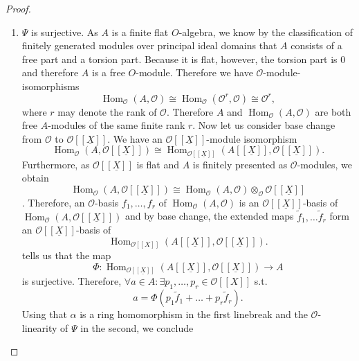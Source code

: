 \documentclass{article}
\theoremstyle{plain}%
\theoremstyle{definition}
\theoremstyle{remark}
\renewcommand{\hom}{\operatorname{Hom}}
\begin{document}
\begin{proof}
\begin{enumerate}
        \item \(\Psi\) is surjective.
        As \(A\) is a finite flat \(O\)-algebra, we know by the classification of finitely generated modules
        over principal ideal domains that \(A\) consists of a free part and a torsion part. Because it is flat,
        however, the torsion part is 0 and therefore \(A\) is a free \(O\)-module.
        Therefore we have \(\mathcal{O}\)-module-isomorphisms
        \[
            \hom_\mathcal{O}(A, \mathcal{O}) \cong \hom_\mathcal{O}(\mathcal{O}^r, \mathcal{O})
            \cong \mathcal{O}^r,
        \]
        where \(r\) may denote the rank of \(\mathcal{O}\). 
        Therefore \(A\) and \(\hom_\mathcal{O}(A, \mathcal{O})\) are both free \(A\)-modules of the 
        same finite rank \(r\). Now let us consider base change from \(\mathcal{O}\) to \(\mathcal{O}[[\underline{X}]]\).
        We have an \(\mathcal{O}[[\underline{X}]]\)-module isomorphism \cite[cf.][\href{https://stacks.math.columbia.edu/tag/05G3}{tag 05G3}]{stacks-project}
        \[
            \hom_\mathcal{O}(A, \mathcal{O}[[\underline{X}]])
            \cong \hom_{\mathcal{O}[[\underline{X}]]}(A[[\underline{X}]], \mathcal{O}[[\underline{X}]]).
        \]
        Furthermore, as \(\mathcal{O}[[\underline{X}]]\) is flat and \(A\) is finitely presented as \(\mathcal{O}\)-modules, 
        we obtain
        \[
            \hom_\mathcal{O}(A, \mathcal{O}[[\underline{X}]]) 
            \cong \hom_\mathcal{O}(A, \mathcal{O}) \otimes_\mathcal{O}\mathcal{O}[[\underline{X}]]
        \]
        \cite[chapter I, \S 2, section 9]{Bourbaki1989}.
        Therefore, an \(\mathcal{O}\)-basis \(f_1, \dots, f_r\) of \(\hom_\mathcal{O}(A, \mathcal{O})\) is 
        an \(\mathcal{O}[[\underline{X}]]\)-basis of \(\hom_\mathcal{O}(A, \mathcal{O}[[\underline{X}]])\) and
        by base change, the extended maps \(\tilde f_1, \dots \tilde f_r\) form an \(\mathcal{O}[[\underline{X}]]\)-basis
        of 
        \[ 
            \hom_{\mathcal{O}[[X]]}(A[[\underline{X}]], \mathcal{O}[[\underline{X}]]).
        \]
         tells us that the map 
        \[
            \Phi\colon \hom_{\mathcal{O}[[\underline{X}]]}(A[[\underline{X}]], \mathcal{O}[[\underline{X}]]) \to A
        \]
        is surjective.
        Therefore, \(\forall a \in A\colon \exists p_1, \dots, p_r \in \mathcal{O}[[X]]\) s.t.
        \[
            a = \Phi(p_1 \tilde f_1 + \dots + p_r \tilde f_r).
        \]
        Using that \(\alpha\) is a ring homomorphism in the first linebreak and
        the \(\mathcal{O}\)-linearity of \(\Psi\) in the second, we conclude

\end{enumerate}
\end{proof}
\end{document}
